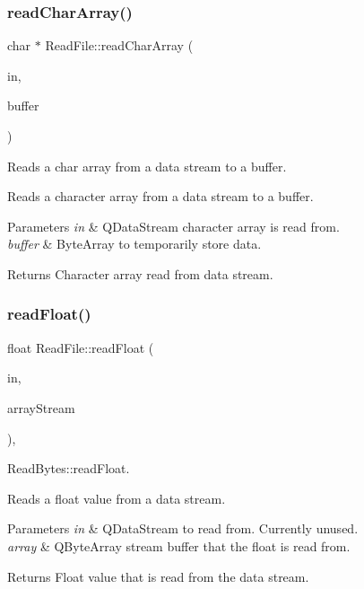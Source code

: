 \subsubsection{\texorpdfstring{read\+Char\+Array()}{readCharArray()}}
{\footnotesize\ttfamily char $\ast$ Read\+File\+::read\+Char\+Array (\begin{DoxyParamCaption}\item[{Q\+Data\+Stream $\ast$}]{in,  }\item[{Q\+Byte\+Array $\ast$}]{buffer }\end{DoxyParamCaption})\hspace{0.3cm}{\ttfamily [static]}}



Reads a char array from a data stream to a buffer. 

Reads a character array from a data stream to a buffer. 
\begin{DoxyParams}{Parameters}
{\em in} & Q\+Data\+Stream character array is read from. \\
\hline
{\em buffer} & Byte\+Array to temporarily store data. \\
\hline
\end{DoxyParams}
\begin{DoxyReturn}{Returns}
Character array read from data stream. 
\end{DoxyReturn}
\mbox{\label{class_read_file_aefd6a71c88d067556d5fcd856666d545}} 
\subsubsection{\texorpdfstring{read\+Float()}{readFloat()}}
{\footnotesize\ttfamily float Read\+File\+::read\+Float (\begin{DoxyParamCaption}\item[{Q\+Data\+Stream $\ast$}]{in,  }\item[{Q\+Data\+Stream $\ast$}]{array\+Stream }\end{DoxyParamCaption})\hspace{0.3cm}{\ttfamily [static]}, {\ttfamily [private]}}



Read\+Bytes\+::read\+Float. 

Reads a float value from a data stream. 
\begin{DoxyParams}{Parameters}
{\em in} & Q\+Data\+Stream to read from. Currently unused. \\
\hline
{\em array} & Q\+Byte\+Array stream buffer that the float is read from. \\
\hline
\end{DoxyParams}
\begin{DoxyReturn}{Returns}
Float value that is read from the data stream. 
\end{DoxyReturn}
\mbox{\label{class_read_file_ab52dc8b21cd580816a9d6c8b2d3b0c49}} 
